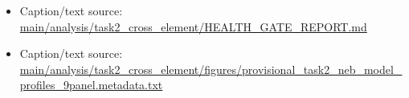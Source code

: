\begin{itemize}[leftmargin=1.4em,noitemsep]
\item Caption/text source: \begingroup\scriptsize\url{main/analysis/task2_cross_element/HEALTH_GATE_REPORT.md}\endgroup
\item Caption/text source: \begingroup\scriptsize\url{main/analysis/task2_cross_element/figures/provisional_task2_neb_model_profiles_9panel.metadata.txt}\endgroup
\end{itemize}
